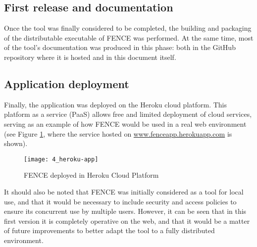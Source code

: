 \subsection{First release and documentation}

Once the tool was finally considered to be completed, the building and packaging of the distributable executable of FENCE was performed. At the same time, most of the tool's documentation was produced in this phase: both in the GitHub repository where it is hosted and in this document itself.

\subsection{Application deployment}

Finally, the application was deployed on the Heroku cloud platform. This platform as a service (PaaS) allows free and limited deployment of cloud services, serving as an example of how FENCE would be used in a real web environment (see Figure \ref{fig:heroku-app}, where the service hosted on \url{www.fenceapp.herokuapp.com} is shown).
	
	\begin{figure}
		\centering
		\texttt{[image: 4\_heroku-app]}
		\caption[FENCE deployed in Heroku]{FENCE deployed in Heroku Cloud Platform}
		\label{fig:heroku-app}
	\end{figure}

It should also be noted that FENCE was initially considered as a tool for local use, and that it would be necessary to include security and access policies to ensure its concurrent use by multiple users. However, it can be seen that in this first version it is completely operative on the web, and that it would be a matter of future improvements to better adapt the tool to a fully distributed environment.